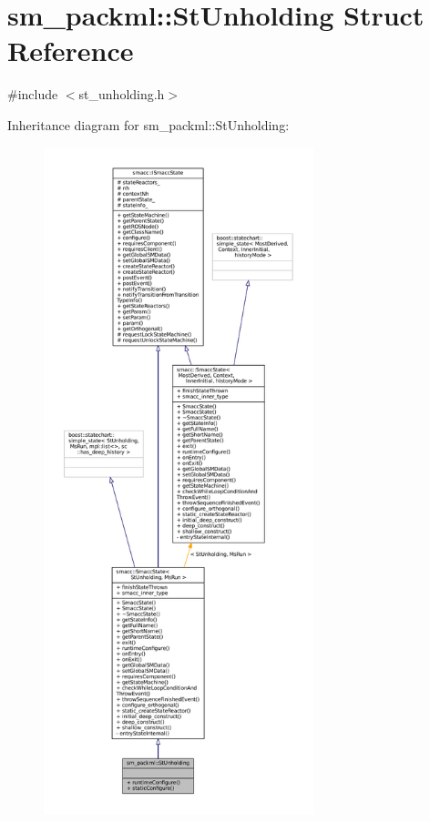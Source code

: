 \hypertarget{structsm__packml_1_1StUnholding}{}\section{sm\+\_\+packml\+:\+:St\+Unholding Struct Reference}
\label{structsm__packml_1_1StUnholding}


{\ttfamily \#include $<$st\+\_\+unholding.\+h$>$}



Inheritance diagram for sm\+\_\+packml\+:\+:St\+Unholding\+:
\nopagebreak
\begin{figure}[H]
\begin{center}
\leavevmode
\includegraphics[height=550pt]{structsm__packml_1_1StUnholding__inherit__graph}
\end{center}
\end{figure}


